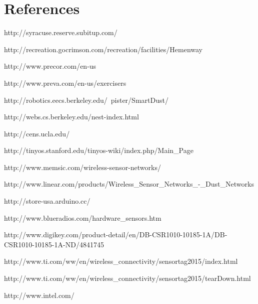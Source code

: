 \documentclass[PPFS.tex]{template/subfiles}
\begin{document}
\section{References}

\renewcommand{\section}[2]{} %

\begin{thebibliography}{}


http://syracuse.reserve.subitup.com/

http://recreation.gocrimson.com/recreation/facilities/Hemenway

http://www.precor.com/en-us

http://www.preva.com/en-us/exercisers

http://robotics.eecs.berkeley.edu/~pister/SmartDust/

http://webs.cs.berkeley.edu/nest-index.html

http://cens.ucla.edu/

http://tinyos.stanford.edu/tinyos-wiki/index.php/Main\_Page

http://www.memsic.com/wireless-sensor-networks/

http://www.linear.com/products/Wireless\_Sensor\_Networks\_-\_Dust\_Networks

http://store-usa.arduino.cc/

http://www.blueradios.com/hardware\_sensors.htm

http://www.digikey.com/product-detail/en/DB-CSR1010-10185-1A/DB-CSR1010-10185-1A-ND/4841745

http://www.ti.com/ww/en/wireless\_connectivity/sensortag2015/index.html

http://www.ti.com/ww/en/wireless\_connectivity/sensortag2015/tearDown.html

http://www.intel.com/


\end{thebibliography}
\end{document}
